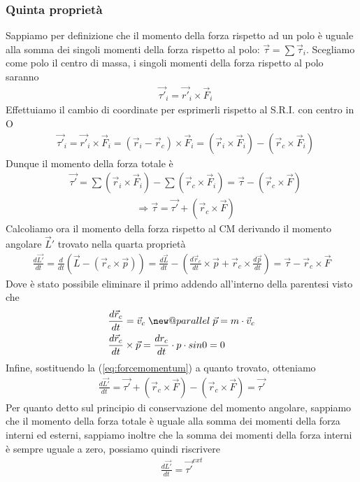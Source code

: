 \documentclass[10pt,a4paper]{article}
\makeatletter
\newcommand{\newparallel}{\mathrel{\mathpalette\new@parallel\relax}}
\newcommand{\new@parallel}[2]{%
	\begingroup
	\sbox\z@{$#1T$}
	\resizebox{!}{\ht\z@}{\raisebox{\depth}{$\m@th#1/\mkern-5mu/$}}%
	\endgroup
}
\makeatother
\begin{document}
\subsubsection{Quinta proprietà}
 Sappiamo per definizione che il momento della forza rispetto ad un polo è uguale alla somma dei singoli momenti della forza rispetto al polo: $\vec{\tau}=\sum \vec{\tau}_i$. Scegliamo come polo il centro di massa, i singoli momenti della forza rispetto al polo saranno
 \begin{align*}
 &\vec{\tau'}_i=\vec{r'}_i \times \vec{F}_i
 \end{align*}
Effettuiamo il cambio di coordinate per esprimerli rispetto al S.R.I. con centro in O
\begin{align*}
	&\vec{\tau'}_i=\vec{r'}_i \times \vec{F}_i=(\vec{r}_i-\vec{r}_c)\times \vec{F}_i= (\vec{r}_i \times \vec{F}_i)-(\vec{r}_c \times \vec{F}_i)
\end{align*}
Dunque il momento della forza totale è
 \begin{align*}
 &\vec{\tau'}= \sum (\vec{r}_i \times \vec{F}_i)- \sum(\vec{r}_c \times \vec{F}_i)=\vec{\tau}-(\vec{r}_c\times \vec{F})
\end{align*}
\begin{align} \label{eq:forcemomentum}
&\Rightarrow \vec{\tau}=\vec{\tau '}+(\vec{r}_c\times \vec{F})
\end{align}
Calcoliamo ora il momento della forza rispetto al CM derivando il momento angolare $\vec{L}'$ trovato nella quarta proprietà
\begin{align*}
\frac{d\vec{L'}}{dt}= \frac{d}{dt}(\vec{L}-(\vec{r}_c \times \vec{p}))= \frac{d\vec{L}}{dt}- (\frac{d \vec{r}_c}{dt}\times \vec{p}+ \vec{r}_c\times \frac{d \vec{p}}{dt}) = \vec{\tau} - \vec{r}_c \times \vec{F}
\end{align*}
Dove è stato possibile eliminare il primo addendo all'interno della parentesi visto che 
\begin{align*}
&\frac{d \vec{r}_c}{dt} = \vec{v}_c \newparallel \vec{p}= m \cdot \vec{v}_c\\
&\frac{d \vec{r}_c}{dt}\times \vec{p}=\frac{d r_c}{dt} \cdot p \cdot sin 0 = 0
\end{align*}
Infine, sostituendo la (\ref{eq:forcemomentum}) a quanto trovato, otteniamo
\begin{align*}
\frac{d\vec{L'}}{dt} = \vec{\tau '}+ (\vec{r}_c\times \vec{F}) - (\vec{r}_c\times \vec{F})= \vec{\tau'}
\end{align*}
Per quanto detto sul principio di conservazione del momento angolare, sappiamo che il momento della forza totale è uguale alla somma dei momenti della forza interni ed esterni, sappiamo inoltre che la somma dei momenti della forza interni è sempre uguale a zero, possiamo quindi riscrivere 
\begin{align}\label{eq:cardinale2}
	\frac{d\vec{L'}}{dt} = \vec{\tau'}^{ext}
\end{align}
\end{document}

